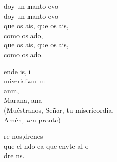 \documentclass[12pt]{article}
\begin{document}
\begin{multicols*}{2}
\begin{cancion}%
	 doy un manto evo \\
	 doy un manto evo \\
	que os ais, que os ais,  \\
	como os ado,\\
	que os ais, que os ais,  \\
	como os ado.\\
\end{cancion}%

\begin{cancion}%
	ende is, i\\
	miseridiam m\\
	anm,\\
	Marana, ana\\
(Muéstranos, Señor, tu misericordia.\\
 Amén, ven pronto)\\
\end{cancion}%

\begin{cancion}%
	re nos,drenes \\
	que el ndo ea que envte al o\\
	dre ns.\\
\end{cancion}%


\end{multicols*}
\end{document}
